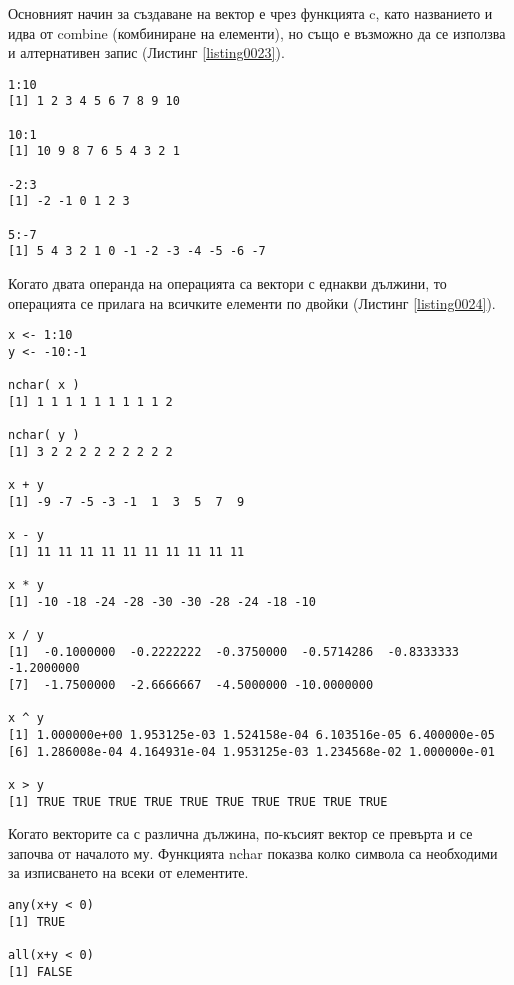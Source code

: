 Основният начин за създаване на вектор е чрез функцията c, като названието и идва от combine (комбиниране на елементи), но също е възможно да се използва и алтернативен запис (Листинг \ref{listing0023}). 

\begin{lstlisting}[caption=Алтернативен синтаксис за създаване на вектори, label=listing0023]
1:10
[1] 1 2 3 4 5 6 7 8 9 10

10:1
[1] 10 9 8 7 6 5 4 3 2 1

-2:3
[1] -2 -1 0 1 2 3

5:-7
[1] 5 4 3 2 1 0 -1 -2 -3 -4 -5 -6 -7
\end{lstlisting}

Когато двата операнда на операцията са вектори с еднакви дължини, то операцията се прилага на всичките елементи по двойки (Листинг \ref{listing0024}).

\begin{lstlisting}[caption=Операции между вектори с еднаква дължина, label=listing0024]
x <- 1:10
y <- -10:-1

nchar( x )
[1] 1 1 1 1 1 1 1 1 1 2

nchar( y )
[1] 3 2 2 2 2 2 2 2 2 2

x + y
[1] -9 -7 -5 -3 -1  1  3  5  7  9

x - y
[1] 11 11 11 11 11 11 11 11 11 11

x * y
[1] -10 -18 -24 -28 -30 -30 -28 -24 -18 -10

x / y
[1]  -0.1000000  -0.2222222  -0.3750000  -0.5714286  -0.8333333  -1.2000000
[7]  -1.7500000  -2.6666667  -4.5000000 -10.0000000

x ^ y
[1] 1.000000e+00 1.953125e-03 1.524158e-04 6.103516e-05 6.400000e-05
[6] 1.286008e-04 4.164931e-04 1.953125e-03 1.234568e-02 1.000000e-01

x > y
[1] TRUE TRUE TRUE TRUE TRUE TRUE TRUE TRUE TRUE TRUE
\end{lstlisting}

Когато векторите са с различна дължина, по-късият вектор се превърта и се започва от началото му. Функцията nchar показва колко символа са необходими за изписването на всеки от елементите. 

\begin{lstlisting}[caption=Проверка дали някоя или всички стойности от вектора отговарят на определено условие, label=listing0025]
any(x+y < 0)
[1] TRUE

all(x+y < 0)
[1] FALSE
\end{lstlisting}

